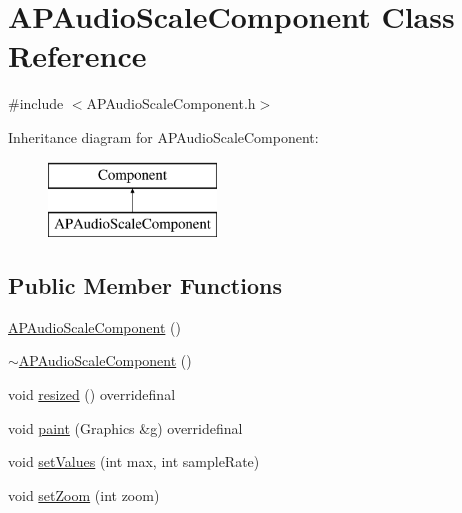 \hypertarget{class_a_p_audio_scale_component}{\section{A\+P\+Audio\+Scale\+Component Class Reference}
\label{class_a_p_audio_scale_component}
}


{\ttfamily \#include $<$A\+P\+Audio\+Scale\+Component.\+h$>$}

Inheritance diagram for A\+P\+Audio\+Scale\+Component\+:\begin{figure}[H]
\begin{center}
\leavevmode
\includegraphics[height=2.000000cm]{class_a_p_audio_scale_component}
\end{center}
\end{figure}
\subsection*{Public Member Functions}
\begin{DoxyCompactItemize}
\item 
\hyperlink{class_a_p_audio_scale_component_ae560d2178f7e2138808dffa9d63a3edc}{A\+P\+Audio\+Scale\+Component} ()
\item 
\hyperlink{class_a_p_audio_scale_component_a84665bd00fef45607e730654d16c2eb1}{$\sim$\+A\+P\+Audio\+Scale\+Component} ()
\item 
void \hyperlink{class_a_p_audio_scale_component_a6ccd9a808d1696121f95920f382247ca}{resized} () overridefinal
\item 
void \hyperlink{class_a_p_audio_scale_component_af4cdde89aad8ed3c4942fafeda46e03c}{paint} (Graphics \&g) overridefinal
\item 
void \hyperlink{class_a_p_audio_scale_component_af252d75f40171dd94349566cc047764d}{set\+Values} (int max, int sample\+Rate)
\item 
void \hyperlink{class_a_p_audio_scale_component_aefe34b461dcf16fb5ddd9307c7f2dcb5}{set\+Zoom} (int zoom)
\end{DoxyCompactItemize}


